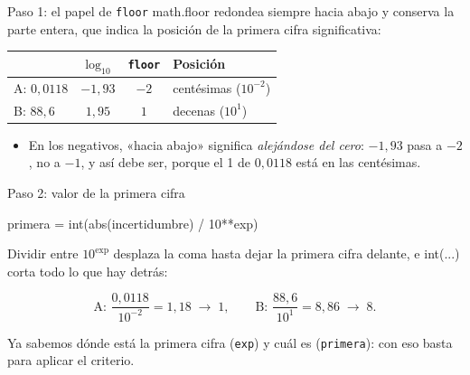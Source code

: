 \documentclass[10pt]{beamer}
\newcommand{\cod}[1]{{\setlength{\fboxsep}{1.4pt}\colorbox{codinline}{\textcolor{codrojo}{\ttfamily\small #1}}}}
\newcommand{\resalta}[1]{\textcolor{structure.fg!75!white}{#1}}
\begin{document}
\begin{frame}{Paso 1: el papel de \texttt{floor}}
  \cod{math.floor} redondea \resalta{siempre hacia abajo} y conserva la parte
  entera, que indica la posición de la primera cifra significativa:
  \begin{block}{}
    \centering
    \begin{tabular}{@{}lccl@{}}
      & $\log_{10}$ & \texttt{floor} & Posición\\
      \midrule
      A: $0{,}0118$ & $-1{,}93$ & $-2$ & centésimas ($10^{-2}$)\\
      B: $88{,}6$ & $1{,}95$ & $1$ & decenas ($10^{1}$)\\
    \end{tabular}
  \end{block}
  \begin{itemize}
    \item En los negativos, «hacia abajo» significa \emph{alejándose del cero}:
      $-1{,}93$ pasa a $-2$, no a $-1$, y así debe ser, porque el 1 de $0{,}0118$
      está en las centésimas.
  \end{itemize}
\end{frame}

\begin{frame}[fragile]{Paso 2: valor de la primera cifra}
  \begin{codigo}
primera = int(abs(incertidumbre) / 10**exp)
  \end{codigo}
  Dividir entre $10^{\text{exp}}$ desplaza la coma hasta dejar la primera cifra
  delante, e \cod{int(...)} corta todo lo que hay detrás:
  \begin{block}{}
    \begin{equation}
      \text{A: }\frac{0{,}0118}{10^{-2}}=1{,}18\;\rightarrow\;1,
      \qquad
      \text{B: }\frac{88{,}6}{10^{1}}=8{,}86\;\rightarrow\;8.
    \end{equation}
  \end{block}
  Ya sabemos \resalta{dónde está} la primera cifra (\texttt{exp}) y
  \resalta{cuál es} (\texttt{primera}): con eso basta para aplicar el criterio.
\end{frame}
\end{document}
